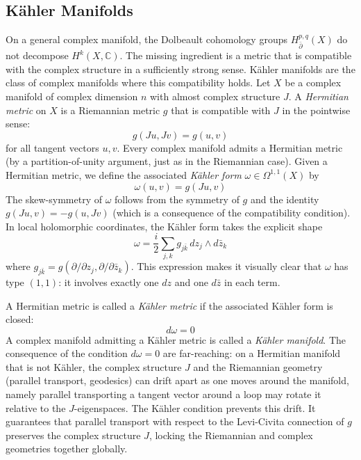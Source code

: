 \documentclass{article}
\newcommand{\C}{\mathbb{C}}
\begin{document}
\subsection{K\"{a}hler Manifolds}\label{subsec:kahler}

On a general complex manifold, the Dolbeault cohomology groups $H^{p,q}_{\bar\partial}(X)$ do not decompose
$H^k(X, \C)$. The missing ingredient is a metric that is compatible with the complex structure in a
sufficiently strong sense. K\"{a}hler manifolds are the class of complex manifolds where this compatibility
holds. Let $X$ be a complex manifold of complex dimension $n$ with almost complex structure $J$. A
\emph{Hermitian metric} on $X$ is a Riemannian metric $g$ that is compatible with $J$ in the pointwise sense:
\[
  g(Ju, Jv) = g(u, v)
\]
for all tangent vectors $u, v$. Every complex manifold admits a Hermitian
metric (by a partition-of-unity argument, just as in the Riemannian case).
Given a Hermitian metric, we define the associated \emph{K\"{a}hler form}
$\omega \in \Omega^{1,1}(X)$ by
\[
  \omega(u, v) = g(Ju, v)
\]
The skew-symmetry of $\omega$ follows from the symmetry of $g$ and the
identity $g(Ju, v) = -g(u, Jv)$ (which is a consequence of the compatibility
condition). In local holomorphic coordinates, the K\"{a}hler form takes the
explicit shape
\[
  \omega = \frac{i}{2} \sum_{j,k} g_{j\bar{k}}\, dz_j \wedge d\bar{z}_k
\]
where $g_{j\bar{k}} = g(\partial/\partial z_j, \partial/\partial \bar{z}_k)$.
This expression makes it visually clear that $\omega$ has type $(1,1)$: it
involves exactly one $dz$ and one $d\bar{z}$ in each term.

A Hermitian metric is called a \emph{K\"{a}hler metric} if the associated
K\"{a}hler form is closed:
\[
  d\omega = 0
\]
A complex manifold admitting a K\"{a}hler metric is called a \emph{K\"{a}hler
manifold}. The consequence of the condition $d\omega = 0$ are far-reaching: on a Hermitian manifold that is not K\"{a}hler,
the complex structure $J$ and the Riemannian geometry (parallel transport,
geodesics) can drift apart as one moves around the manifold, namely parallel
transporting a tangent vector around a loop may rotate it relative to the
$J$-eigenspaces. The K\"{a}hler condition prevents this drift. It guarantees
that parallel transport with respect to the Levi-Civita connection of $g$
preserves the complex structure $J$, locking the Riemannian and complex
geometries together globally.
\end{document}
